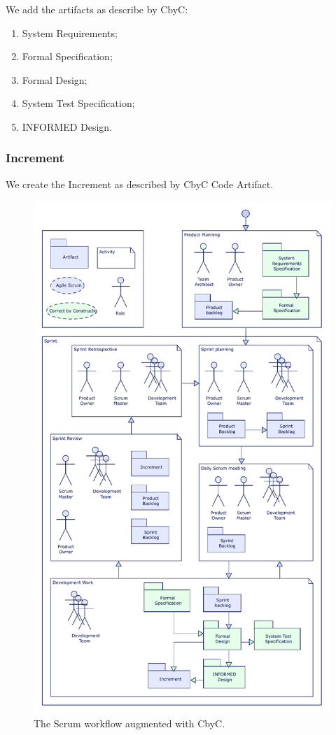 We add the artifacts as describe by CbyC: 

\begin{enumerate}
	\item System Requirements;
	\item Formal Specification;
	\item Formal Design;
	\item System Test Specification;
	\item INFORMED Design.
\end{enumerate}  

\subsubsection{Increment}
We create the Increment as described by CbyC Code Artifact.


\begin{figure}[H]
	\centering
	\includegraphics[scale=0.75]{Figures/Scrum_CbyC_workflow.pdf}
	\decoRule
	\caption{The Scrum workflow augmented with CbyC.}
	\label{fig:ScrumCbyCWorkflow}
\end{figure}